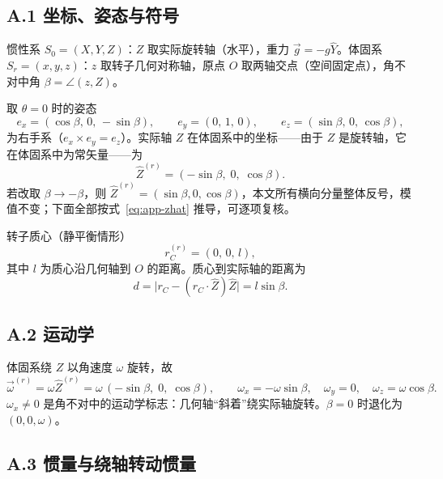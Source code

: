 
\subsection*{A.1 坐标、姿态与符号}

惯性系 $S_0=(X,Y,Z)$：$Z$ 取实际旋转轴（水平），重力 $\vec g=-g\hat Y$。体固系 $S_r=(x,y,z)$：$z$ 取转子几何对称轴，原点 $O$ 取两轴交点（空间固定点），角不对中角 $\beta=\angle(z,Z)$。

取 $\theta=0$ 时的姿态
\begin{equation}
e_x=(\cos\beta,\,0,\,-\sin\beta),\qquad
e_y=(0,\,1,\,0),\qquad
e_z=(\sin\beta,\,0,\,\cos\beta),
\end{equation}
为右手系（$e_x\times e_y=e_z$）。实际轴 $Z$ 在体固系中的坐标——由于 $Z$ 是旋转轴，它在体固系中为常矢量——为
\begin{equation}
\hat Z^{(r)}=(-\sin\beta,\;0,\;\cos\beta).
\label{eq:app-zhat}
\end{equation}
若改取 $\beta\to-\beta$，则 $\hat Z^{(r)}=(\sin\beta,0,\cos\beta)$，本文所有横向分量整体反号，模值不变；下面全部按式~\eqref{eq:app-zhat} 推导，可逐项复核。

转子质心（静平衡情形）
\begin{equation}
r_C^{(r)}=(0,\,0,\,l),
\end{equation}
其中 $l$ 为质心沿几何轴到 $O$ 的距离。质心到实际轴的距离为
\begin{equation}
d=\bigl|r_C-(r_C\cdot\hat Z)\hat Z\bigr|=l\sin\beta .
\label{eq:app-d}
\end{equation}

\subsection*{A.2 运动学}

体固系绕 $Z$ 以角速度 $\omega$ 旋转，故
\begin{equation}
\vec\omega^{(r)}=\omega\hat Z^{(r)}
=\omega\,(-\sin\beta,\;0,\;\cos\beta),
\qquad
\omega_x=-\omega\sin\beta,\quad \omega_y=0,\quad \omega_z=\omega\cos\beta .
\label{eq:app-omega}
\end{equation}
$\omega_x\neq0$ 是角不对中的运动学标志：几何轴“斜着”绕实际轴旋转。$\beta=0$ 时退化为 $(0,0,\omega)$。

\subsection*{A.3 惯量与绕轴转动惯量}

